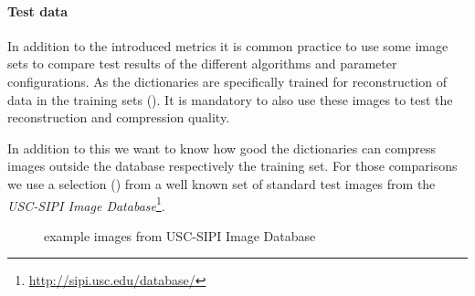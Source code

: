 
\paragraph{Test data}
In addition to the introduced metrics it is common practice to use some image
sets to compare test results of the different algorithms and parameter
configurations. As the dictionaries are specifically trained for
reconstruction of data in the training sets
(). It is mandatory to also use
these images to test the reconstruction and compression quality. 

In addition to this we want to know how good the dictionaries can compress
images outside the database respectively the training set. For
those comparisons we use a selection () from a
well known set of standard test images from the \emph{USC-SIPI Image
Database}\footnote{\url{http://sipi.usc.edu/database/}}. 
\begin{figure}[H]
\centering
\hspace{5mm}
\hspace{5mm}
\caption{example images from USC-SIPI Image Database}
\label{fig:USC-SIPI}
\end{figure}

